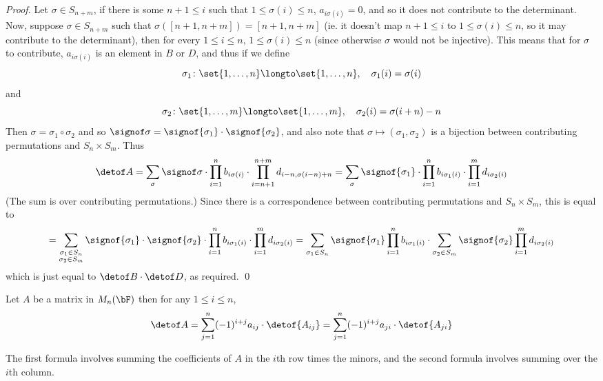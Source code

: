 \begin{proof}

    Let $\sigma\in S_{n+m}$, if there is some $n+1\leq i$ such that $1\leq\sigma(i)\leq n$, $a_{i\sigma(i)}=0$, and so it does not contribute to the determinant.
    Now, suppose $\sigma\in S_{n+m}$ such that $\sigma([n+1,n+m])=[n+1,n+m]$ (ie. it doesn't map $n+1\leq i$ to $1\leq\sigma(i)\leq n$, so it may contribute to the determinant), then for every
    $1\leq i\leq n$, $1\leq\sigma(i)\leq n$ (since otherwise $\sigma$ would not be injective).
    This means that for $\sigma$ to contribute, $a_{i\sigma(i)}$ is an element in $B$ or $D$, and thus if we define
    \[ \sigma_1\colon\set{1,\dots,n}\longto\set{1,\dots,n},\quad \sigma_1(i) = \sigma(i) \]
    and
    \[ \sigma_2\colon\set{1,\dots,m}\longto\set{1,\dots,m},\quad \sigma_2(i) = \sigma(i+n)-n \]
    Then $\sigma=\sigma_1\circ\sigma_2$ and so $\signof\sigma=\signof{\sigma_1}\cdot\signof{\sigma_2}$, and also note that $\sigma\mapsto(\sigma_1,\sigma_2)$ is a bijection between contributing permutations
    and $S_n\times S_m$.
    Thus
    \[ \detof A = \sum_{\sigma}\signof\sigma\cdot\prod_{i=1}^n b_{i\sigma(i)}\cdot\prod_{i=n+1}^{n+m} d_{i-n,\sigma(i-n)+n} =
    \sum_{\sigma}\signof{\sigma_1}\cdot\prod_{i=1}^n b_{i\sigma_1(i)}\cdot\prod_{i=1}^m d_{i\sigma_2(i)} \]
    (The sum is over contributing permutations.)
    Since there is a correspondence between contributing permutations and $S_n\times S_m$, this is equal to
    \[ = \sum_{\substack{\sigma_1\in S_n\\\sigma_2\in S_m}}\signof{\sigma_1}\cdot\signof{\sigma_2}\cdot\prod_{i=1}^n b_{i\sigma_1(i)}\cdot\prod_{i=1}^m d_{i\sigma_2(i)} =
    \sum_{\sigma_1\in S_n}\signof{\sigma_1}\prod_{i=1}^n b_{i\sigma_1(i)} \cdot \sum_{\sigma_2\in S_m}\signof{\sigma_2}\prod_{i=1}^m d_{i\sigma_2(i)} \]
    which is just equal to $\detof B\cdot\detof D$, as required.
    \qed

\end{proof}

\begin{thrm*}

    Let $A$ be a matrix in $M_n(\bF)$ then for any $1\leq i\leq n$,
    \[ \detof A = \sum_{j=1}^n (-1)^{i+j} a_{ij}\cdot\detof{A_{ij}} = \sum_{j=1}^n (-1)^{i+j} a_{ji}\cdot\detof{A_{ji}} \]

\end{thrm*}

The first formula involves summing the coefficients of $A$ in the $i$th row times the minors, and the second formula involves summing over the $i$th column.

